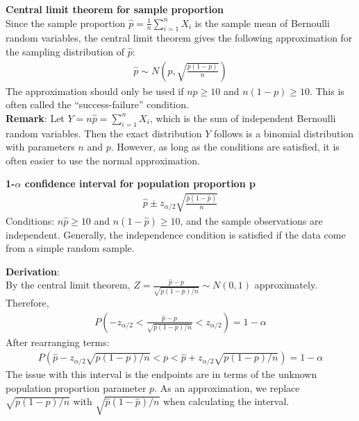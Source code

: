 \documentclass[fleqn, 11pt]{article}\usepackage[]{graphicx}\usepackage[]{color}
\begin{document}
\textbf{Central limit theorem for sample proportion}\\

Since the sample proportion $\hat{p} = \frac{1}{n} \sum_{i=1}^n X_i$ is the sample mean of Bernoulli random variables, the central limit theorem gives the following approximation for the sampling distribution of $\hat{p}$:  
\begin{align*}
\hat{p} \sim N\left(p, \sqrt{\frac{p(1-p)}{n}} \right)
\end{align*}
The approximation should only be used if $np \geq 10$ and $n(1-p) \geq 10$.  This is often called the ``success-failure'' condition.\\

\textbf{Remark}:  Let $Y = n\hat{p} = \sum_{i=1}^n X_i$, which is the sum of independent Bernoulli random variables.  Then the exact distribution $Y$ follows is a binomial distribution with parameters $n$ and $p$.  However, as long as the conditions are satisfied, it is often easier to use the normal approximation.\\
\vspace{22pt}

\textbf{1-$\alpha$ confidence interval for population proportion p}
\begin{align*}
\hat{p} \pm z_{\alpha / 2}  \sqrt{\frac{\hat{p}(1-\hat{p})}{n}}
\end{align*}
Conditions: $n \hat{p} \geq 10$ and $n (1-\hat{p}) \geq 10$, and the sample observations are independent.  Generally, the independence condition is satisfied if the data come from a simple random sample.\\
\vspace{11pt}

\textbf{Derivation}:\\
By the central limit theorem, $Z = \frac{\hat{p} - p}{\sqrt{p(1-p)/n}} \sim N(0,1)$ approximately.  Therefore,
\begin{align*}
P \left(-z_{\alpha/2} < \frac{\hat{p} - p}{\sqrt{p(1-p)/n}} < z_{\alpha/2} \right) = 1-\alpha
\end{align*}
After rearranging terms:
\begin{align*}
P \left(\hat{p} - z_{\alpha/2}\sqrt{p(1-p)/n} < p < \hat{p} + z_{\alpha/2}\sqrt{p(1-p)/n} \right) = 1-\alpha
\end{align*}
The issue with this interval is the endpoints are in terms of the unknown population proportion parameter $p$.  As an approximation, we replace $\sqrt{p(1-p)/n}$ with $\sqrt{\hat{p}(1-\hat{p})/n}$ when calculating the interval.\\
\clearpage
\end{document}
